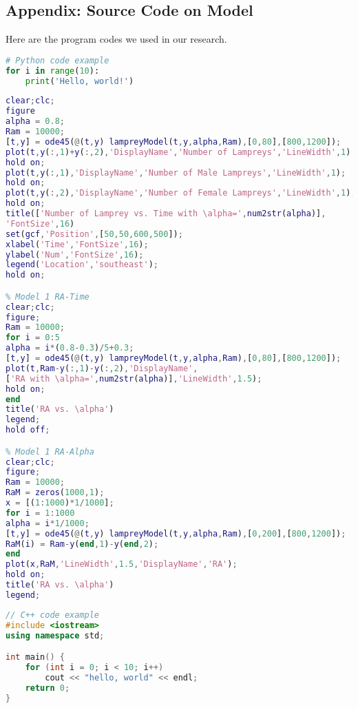 \documentclass[12pt]{article}  %
\begin{document}
\begin{subappendices}  %

\section{Appendix: Source Code on Model}
Here are the program codes we used in our research.


\begin{lstlisting}[language=Python, name={test.py}]
# Python code example
for i in range(10):
    print('Hello, world!')
\end{lstlisting}

\begin{lstlisting}[language=MATLAB, name={test.m}]
% Model 1
clear;clc;
figure
alpha = 0.8;
Ram = 10000;
[t,y] = ode45(@(t,y) lampreyModel(t,y,alpha,Ram),[0,80],[800,1200]);
plot(t,y(:,1)+y(:,2),'DisplayName','Number of Lampreys','LineWidth',1);
hold on;
plot(t,y(:,1),'DisplayName','Number of Male Lampreys','LineWidth',1);
hold on;
plot(t,y(:,2),'DisplayName','Number of Female Lampreys','LineWidth',1);
hold on;
title(['Number of Lamprey vs. Time with \alpha=',num2str(alpha)],
'FontSize',16)
set(gcf,'Position',[50,50,600,500]);
xlabel('Time','FontSize',16);
ylabel('Num','FontSize',16);
legend('Location','southeast');
hold on;

% Model 1 RA-Time
clear;clc;
figure;
Ram = 10000;
for i = 0:5
alpha = i*(0.8-0.3)/5+0.3;
[t,y] = ode45(@(t,y) lampreyModel(t,y,alpha,Ram),[0,80],[800,1200]);
plot(t,Ram-y(:,1)-y(:,2),'DisplayName',
['RA with \alpha=',num2str(alpha)],'LineWidth',1.5);
hold on;
end
title('RA vs. \alpha')
legend;
hold off;

% Model 1 RA-Alpha
clear;clc;
figure;
Ram = 10000;
RaM = zeros(1000,1);
x = [(1:1000)*1/1000];
for i = 1:1000
alpha = i*1/1000;
[t,y] = ode45(@(t,y) lampreyModel(t,y,alpha,Ram),[0,200],[800,1200]);
RaM(i) = Ram-y(end,1)-y(end,2);
end
plot(x,RaM,'LineWidth',1.5,'DisplayName','RA');
hold on;
title('RA vs. \alpha')
legend;
\end{lstlisting}

\begin{lstlisting}[language=C++, name={test.cpp}]
// C++ code example
#include <iostream>
using namespace std;

int main() {
    for (int i = 0; i < 10; i++)
        cout << "hello, world" << endl;
    return 0;
}
\end{lstlisting}

\end{subappendices}  %
\end{document}
